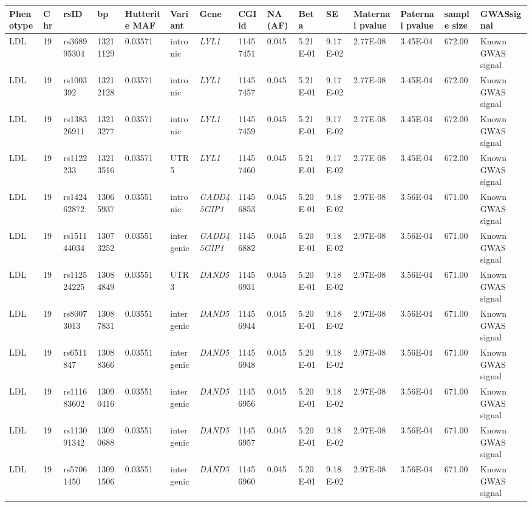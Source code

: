 \begin{landscape}
\begin{table}
\centering
\begin{adjustbox}{max width=\linewidth}
\begin{tabular}{@{}p{2cm}|p{0.5cm}p{2cm}p{2cm}p{1.5cm}p{3cm}p{2.5cm}p{1.5cm}p{1cm}p{2cm}p{2cm}p{2cm}p{2cm}p{1.5cm}p{4cm}@{}}
\toprule 
Phenotype&Chr&rsID&bp&Hutterite MAF&Variant&Gene&CGI id&NA (AF)&Beta&SE&Maternal pvalue &Paternal pvalue &sample size&GWASsignal\\  \midrule
LDL&19&rs368995304&13211129&0.03571&intronic&\emph{LYL1}&11457451&0.045&5.21E-01&9.17E-02&2.77E-08&3.45E-04&672.00&Known GWAS signal\\ \hline
LDL&19&rs1003392&13212128&0.03571&intronic&\emph{LYL1}&11457457&0.045&5.21E-01&9.17E-02&2.77E-08&3.45E-04&672.00&Known GWAS signal\\ \hline
LDL&19&rs138326911&13213277&0.03571&intronic&\emph{LYL1}&11457459&0.045&5.21E-01&9.17E-02&2.77E-08&3.45E-04&672.00&Known GWAS signal\\ \hline
LDL&19&rs1122233&13213516&0.03571&UTR5&\emph{LYL1}&11457460&0.045&5.21E-01&9.17E-02&2.77E-08&3.45E-04&672.00&Known GWAS signal\\ \hline
LDL&19&rs142462872&13065937&0.03551&intronic&\emph{GADD45GIP1}&11456853&0.045&5.20E-01&9.18E-02&2.97E-08&3.56E-04&671.00&Known GWAS signal\\ \hline
LDL&19&rs151144034&13073252&0.03551&intergenic&\emph{GADD45GIP1}&11456882&0.045&5.20E-01&9.18E-02&2.97E-08&3.56E-04&671.00&Known GWAS signal\\ \hline
LDL&19&rs112524225&13084849&0.03551&UTR3&\emph{DAND5}&11456931&0.045&5.20E-01&9.18E-02&2.97E-08&3.56E-04&671.00&Known GWAS signal\\ \hline
LDL&19&rs80073013&13087831&0.03551&intergenic&\emph{DAND5}&11456944&0.045&5.20E-01&9.18E-02&2.97E-08&3.56E-04&671.00&Known GWAS signal\\ \hline
LDL&19&rs6511847&13088366&0.03551&intergenic&\emph{DAND5}&11456948&0.045&5.20E-01&9.18E-02&2.97E-08&3.56E-04&671.00&Known GWAS signal\\ \hline
LDL&19&rs111683602&13090416&0.03551&intergenic&\emph{DAND5}&11456956&0.045&5.20E-01&9.18E-02&2.97E-08&3.56E-04&671.00&Known GWAS signal\\ \hline
LDL&19&rs113091342&13090688&0.03551&intergenic&\emph{DAND5}&11456957&0.045&5.20E-01&9.18E-02&2.97E-08&3.56E-04&671.00&Known GWAS signal\\ \hline
LDL&19&rs57061450&13091506&0.03551&intergenic&\emph{DAND5}&11456960&0.045&5.20E-01&9.18E-02&2.97E-08&3.56E-04&671.00&Known GWAS signal\\ \hline

\end{tabular}
\end{adjustbox}
\end{table}
\end{landscape}
